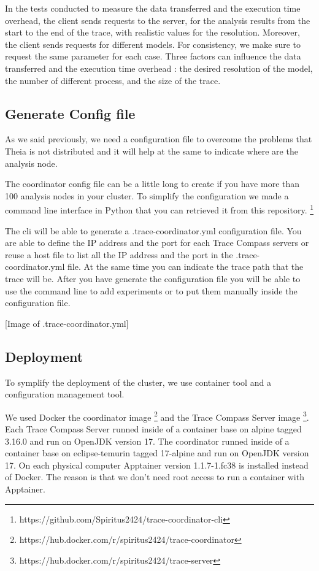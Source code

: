In the tests conducted to measure the data transferred and the execution time overhead, the client sends requests to the server, for the analysis results from the start to the end of the trace, with realistic values for the resolution. Moreover, the client sends requests for different models. For consistency, we make sure to request the same parameter for each case. Three factors can influence the data transferred and the execution time overhead : the desired resolution of the model, the number of different process, and the size of the trace.

\subsection{Generate Config file}

As we said previously, we need a configuration file to overcome the problems that Theia is not distributed and it will help at the same to indicate where are the analysis node. 

The coordinator config file can be a little long to create if you have more than 100 analysis nodes in your cluster. To simplify the configuration we made a command line interface in Python that you can retrieved it from this repository. \footnote{https://github.com/Spiritus2424/trace-coordinator-cli}

The cli will be able to generate a .trace-coordinator.yml configuration file. You are able to define the IP address and the port for each Trace Compass servers or reuse a host file to list all the IP address and the port in the .trace-coordinator.yml file. At the same time you can indicate the trace path that the trace will be. After you have generate the configuration file you will be able to use the command line to add experiments or to put them manually inside the configuration file.

[Image of .trace-coordinator.yml]

\subsection{Deployment}

To symplify the deployment of the cluster, we use container tool and a configuration management tool.

We used Docker the coordinator image \footnote{https://hub.docker.com/r/spiritus2424/trace-coordinator} and the Trace Compass Server image \footnote{https://hub.docker.com/r/spiritus2424/trace-server}. Each Trace Compass Server runned inside of a container base on alpine tagged 3.16.0 and run on OpenJDK version 17. The coordinator runned inside of a container base on eclipse-temurin tagged 17-alpine and run on OpenJDK version 17. On each physical computer Apptainer \cite{apptainerHome} version 1.1.7-1.fc38 is installed instead of Docker. The reason is that we don't need root access to run a container with Apptainer.

